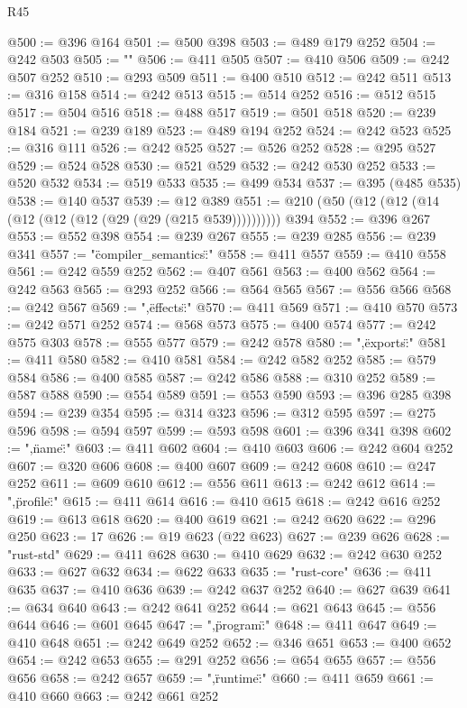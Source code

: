 \begin{lexlean}{R45}
\begin{coremodule}
@500 := @396 @164
@501 := @500 @398
@503 := @489 @179 @252
@504 := @242 @503
@505 := "\n"
@506 := @411 @505
@507 := @410 @506
@509 := @242 @507 @252
@510 := @293 @509
@511 := @400 @510
@512 := @242 @511
@513 := @316 @158
@514 := @242 @513
@515 := @514 @252
@516 := @512 @515
@517 := @504 @516
@518 := @488 @517
@519 := @501 @518
@520 := @239 @184
@521 := @239 @189
@523 := @489 @194 @252
@524 := @242 @523
@525 := @316 @111
@526 := @242 @525
@527 := @526 @252
@528 := @295 @527
@529 := @524 @528
@530 := @521 @529
@532 := @242 @530 @252
@533 := @520 @532
@534 := @519 @533
@535 := @499 @534
@537 := @395 (@485 @535)
@538 := @140 @537
@539 := @12 @389
@551 := @210 (@50 (@12 (@12 (@14 (@12 (@12 (@12 (@29 (@29 (@215 @539)))))))))) @394
@552 := @396 @267
@553 := @552 @398
@554 := @239 @267
@555 := @239 @285
@556 := @239 @341
@557 := "{\"compiler_semantics\":"
@558 := @411 @557
@559 := @410 @558
@561 := @242 @559 @252
@562 := @407 @561
@563 := @400 @562
@564 := @242 @563
@565 := @293 @252
@566 := @564 @565
@567 := @556 @566
@568 := @242 @567
@569 := ",\"effects\":"
@570 := @411 @569
@571 := @410 @570
@573 := @242 @571 @252
@574 := @568 @573
@575 := @400 @574
@577 := @242 @575 @303
@578 := @555 @577
@579 := @242 @578
@580 := ",\"exports\":"
@581 := @411 @580
@582 := @410 @581
@584 := @242 @582 @252
@585 := @579 @584
@586 := @400 @585
@587 := @242 @586
@588 := @310 @252
@589 := @587 @588
@590 := @554 @589
@591 := @553 @590
@593 := @396 @285 @398
@594 := @239 @354
@595 := @314 @323
@596 := @312 @595
@597 := @275 @596
@598 := @594 @597
@599 := @593 @598
@601 := @396 @341 @398
@602 := ",\"name\":"
@603 := @411 @602
@604 := @410 @603
@606 := @242 @604 @252
@607 := @320 @606
@608 := @400 @607
@609 := @242 @608
@610 := @247 @252
@611 := @609 @610
@612 := @556 @611
@613 := @242 @612
@614 := ",\"profile\":"
@615 := @411 @614
@616 := @410 @615
@618 := @242 @616 @252
@619 := @613 @618
@620 := @400 @619
@621 := @242 @620
@622 := @296 @250
@623 := 17
@626 := @19 @623 (@22 @623)
@627 := @239 @626
@628 := "rust-std"
@629 := @411 @628
@630 := @410 @629
@632 := @242 @630 @252
@633 := @627 @632
@634 := @622 @633
@635 := "rust-core"
@636 := @411 @635
@637 := @410 @636
@639 := @242 @637 @252
@640 := @627 @639
@641 := @634 @640
@643 := @242 @641 @252
@644 := @621 @643
@645 := @556 @644
@646 := @601 @645
@647 := ",\"program\":"
@648 := @411 @647
@649 := @410 @648
@651 := @242 @649 @252
@652 := @346 @651
@653 := @400 @652
@654 := @242 @653
@655 := @291 @252
@656 := @654 @655
@657 := @556 @656
@658 := @242 @657
@659 := ",\"runtime\":"
@660 := @411 @659
@661 := @410 @660
@663 := @242 @661 @252
}
\end{coremodule}
\end{lexlean}
